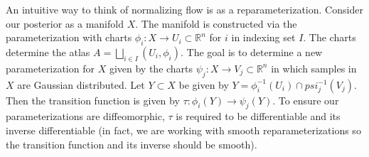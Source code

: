 An intuitive way to think of normalizing flow is as a reparameterization. Consider our posterior as a manifold $X$. The manifold is constructed via the parameterization with charts $\phi_i:X\rightarrow U_i \subset \mathbb{R}^n$ for $i$ in indexing set $I$. 
The charts determine the atlas $A = \bigsqcup\limits_{i\in I} (U_i,\phi_i)$. 
The goal is to determine a new parameterization for $X$ given by the charts $\psi_j:X\rightarrow V_j \subset \mathbb{R}^n$ in which samples in $X$ are Gaussian distributed. 
Let $Y \subset X$ be given by $Y = \phi_i^{-1}(U_i) \cap psi_j^{-1}(V_j)$. 
Then the transition function is given by $\tau:\phi_i(Y)\rightarrow\psi_j(Y)$. 
To ensure our parameterizations are diffeomorphic, $\tau$ is required to be differentiable and its inverse differentiable 
(in fact, we are working with smooth reparameterizations so the transition function and its inverse should be smooth).


